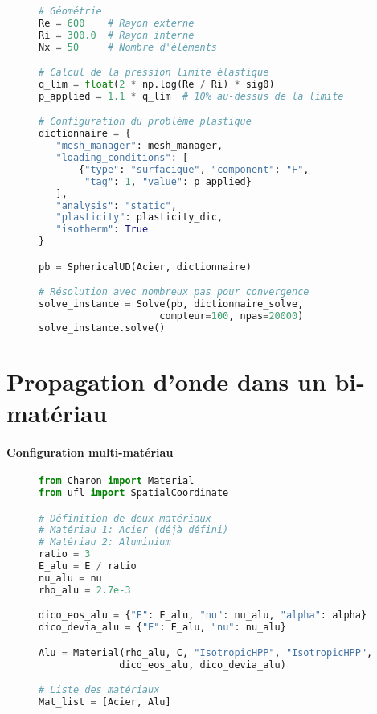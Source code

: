\documentclass[10pt]{book}
\begin{document}
\begin{figure}[h!]
\begin{lstlisting}[language=python]
# Géométrie
Re = 600    # Rayon externe
Ri = 300.0  # Rayon interne
Nx = 50     # Nombre d'éléments

# Calcul de la pression limite élastique
q_lim = float(2 * np.log(Re / Ri) * sig0)
p_applied = 1.1 * q_lim  # 10% au-dessus de la limite

# Configuration du problème plastique
dictionnaire = {
   "mesh_manager": mesh_manager,
   "loading_conditions": [
       {"type": "surfacique", "component": "F", 
        "tag": 1, "value": p_applied}
   ],
   "analysis": "static",
   "plasticity": plasticity_dic,
   "isotherm": True
}

pb = SphericalUD(Acier, dictionnaire)

# Résolution avec nombreux pas pour convergence
solve_instance = Solve(pb, dictionnaire_solve, 
                     compteur=100, npas=20000)
solve_instance.solve()
\end{lstlisting}
\end{figure}

\clearpage

\section{Propagation d'onde dans un bi-matériau}\label{Section:Propagation d'onde dans un bi-matériau}

\paragraph{Configuration multi-matériau}

\begin{figure}[h!]
\begin{lstlisting}[language=python]
from Charon import Material
from ufl import SpatialCoordinate

# Définition de deux matériaux
# Matériau 1: Acier (déjà défini)
# Matériau 2: Aluminium
ratio = 3
E_alu = E / ratio
nu_alu = nu
rho_alu = 2.7e-3

dico_eos_alu = {"E": E_alu, "nu": nu_alu, "alpha": alpha}
dico_devia_alu = {"E": E_alu, "nu": nu_alu}

Alu = Material(rho_alu, C, "IsotropicHPP", "IsotropicHPP", 
              dico_eos_alu, dico_devia_alu)

# Liste des matériaux
Mat_list = [Acier, Alu]
\end{lstlisting}
\end{figure}
\end{document}
